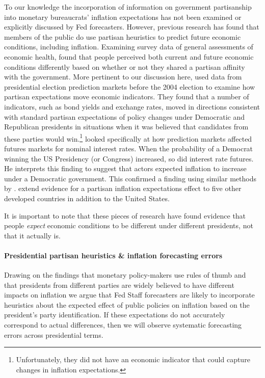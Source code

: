 \documentclass[a4paper]{article}
\begin{document}
To our knowledge the incorporation of information on government partisanship into monetary bureaucrats' inflation expectations has not been examined or explicitly discussed by Fed forecasters. However, previous research has found that members of the public do use partisan heuristics to predict future economic conditions, including inflation. Examining survey data of general assessments of economic health, \cite{Duch2000} found that people perceived both current and future economic conditions differently based on whether or not they shared a partisan affinity with the government. More pertinent to our discussion here, \cite{Snowberg2007} used data from presidential election prediction markets before the 2004 election to examine how partisan expectations move economic indicators. They found that a number of indicators, such as bond yields and exchange rates, moved in directions consistent with standard partisan expectations of policy changes under Democratic and Republican presidents in situations when it was believed that candidates from these parties would win.\footnote{Unfortunately, they did not have an economic indicator that could capture changes in inflation expectations.} \cite{Fowler2006} looked specifically at how prediction markets affected futures markets for nominal interest rates. When the probability of a Democrat winning the US Presidency (or Congress) increased, so did interest rate futures. He interprets this finding to suggest that actors expected inflation to increase under a Democratic government. This confirmed a finding using similar methods by \cite{Alesina1997}. \cite{Berlemann2006} extend evidence for a partisan inflation expectations effect to five other developed countries in addition to the United States.

It is important to  note that these pieces of research have found evidence that people {\emph{expect}} economic conditions to be different under different presidents, not that it actually is.

\paragraph{Presidential partisan heuristics \& inflation forecasting errors}

Drawing on the findings that monetary policy-makers use rules of thumb and that presidents from different parties are widely believed to have different impacts on inflation we argue that Fed Staff forecasters are likely to incorporate heuristics about the expected effect of public policies on inflation based on the president's party identification. If these expectations do not accurately correspond to actual differences, then we will observe systematic forecasting errors across presidential terms.
\end{document}
